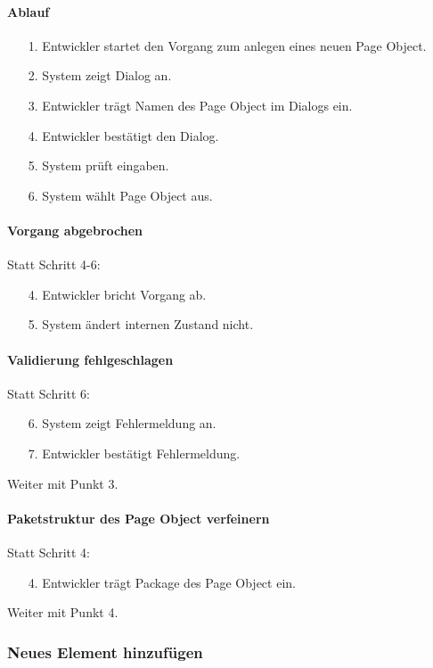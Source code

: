 \paragraph{Ablauf}

\begin{itemize}[itemsep=0pt]
\item[1.] Entwickler startet den Vorgang zum anlegen eines neuen Page Object. 
\item[2.] System zeigt Dialog an. 
\item[3.] Entwickler trägt Namen des Page Object im Dialogs ein.
\item[4.] Entwickler bestätigt den Dialog.
\item[5.] System prüft eingaben.
\item[6.] System wählt Page Object aus.
\end{itemize}

\paragraph{Vorgang abgebrochen}
Statt Schritt 4-6:
\begin{itemize}[itemsep=0pt]
\item[4.] Entwickler bricht Vorgang ab. 
\item[5.] System ändert internen Zustand nicht. 
\end{itemize}

\paragraph{Validierung fehlgeschlagen}
Statt Schritt 6:
\begin{itemize}[itemsep=0pt]
\item[6.] System zeigt Fehlermeldung an. 
\item[7.] Entwickler bestätigt Fehlermeldung. 
\end{itemize}
Weiter mit Punkt 3. 

\paragraph{Paketstruktur des Page Object verfeinern}
Statt Schritt 4:
\begin{itemize}[itemsep=0pt]
\item[4.] Entwickler trägt Package des Page Object ein.
\end{itemize}
Weiter mit Punkt 4. 
 

\subsubsection{Neues Element hinzufügen}
\label{sec:neues_element_hinzufügen}

